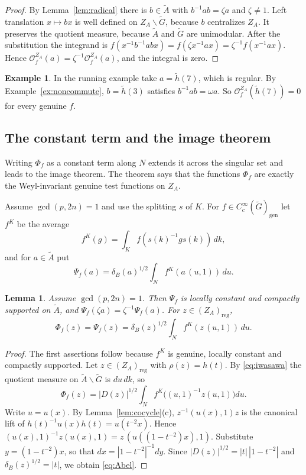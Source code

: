 \documentclass[12pt,letterpaper]{article}
\numberwithin{equation}{section}
\theoremstyle{plain}
\newtheorem{lemma}[theorem]{Lemma}
\theoremstyle{definition}
\newtheorem{example}[theorem]{Example}
\theoremstyle{remark}
\newcommand{\Gt}{\widetilde G}
\newcommand{\At}{\widetilde A}
\newcommand{\hl}{\tilde h}
\newcommand{\ZA}{Z_A}
\newcommand{\gen}{\mathrm{gen}}
\newcommand{\reg}{\mathrm{reg}}
\begin{document}
\begin{proof}
By Lemma~\ref{lem:radical} there is $b\in\At$ with $b^{-1}ab=\zeta a$
and $\zeta\ne1$. Left translation $x\mapsto bx$ is well defined on
$\ZA\backslash\Gt$, because $b$ centralizes $\ZA$. It preserves the
quotient measure, because $\At$ and $\Gt$ are unimodular. After the
substitution the integrand is
$f(x^{-1}b^{-1}abx)=f(\zeta x^{-1}ax)=\zeta^{-1}f(x^{-1}ax)$. Hence
$\mathcal O_f^{\ZA}(a)=\zeta^{-1}\mathcal O_f^{\ZA}(a)$, and the
integral is zero.
\end{proof}

\begin{example}\label{ex:vanishing}
In the running example take $a=\hl(7)$, which is regular. By
Example~\ref{ex:noncommute}, $b=\hl(3)$ satisfies $b^{-1}ab=\omega a$.
So
$\mathcal O_f^{\ZA}(\hl(7))=0$ for every genuine $f$.
\end{example}

\subsection*{The constant term and the image theorem}

Writing $\Phi_f$ as a constant term along $N$ extends it across the
singular set and leads to the image theorem. The theorem says that the
functions $\Phi_f$ are exactly the Weyl-invariant genuine test
functions on $\ZA$.

Assume $\gcd(p,2n)=1$ and use the splitting $s$ of $K$. For
$f\in C_c^\infty(\Gt)_\gen$ let $f^K$ be the average
\[
f^K(g)=\int_Kf(s(k)^{-1}gs(k))\,dk,
\]
and for $a\in\At$ put
\begin{equation}\label{eq:Psi}
\Psi_f(a)=\delta_B(a)^{1/2}\int_Nf^K(a\,(u,1))\,du .
\end{equation}

\begin{lemma}\label{lem:abel}
Assume $\gcd(p,2n)=1$. Then $\Psi_f$ is locally constant and compactly
supported on $\At$, and $\Psi_f(\zeta a)=\zeta^{-1}\Psi_f(a)$. For
$z\in(\ZA)_\reg$,
\begin{equation}\label{eq:Abel}
\Phi_f(z)=\Psi_f(z)=\delta_B(z)^{1/2}\int_Nf^K(z\,(u,1))\,du .
\end{equation}
\end{lemma}

\begin{proof}
The first assertions follow because $f^K$ is genuine, locally constant
and compactly supported. Let $z\in(\ZA)_\reg$ with $\rho(z)=h(t)$. By
\eqref{eq:iwasawa} the quotient measure on $\At\backslash\Gt$ is
$du\,dk$, so
\[
\Phi_f(z)=|D(z)|^{1/2}\int_Nf^K\bigl((u,1)^{-1}z(u,1)\bigr)du .
\]
Write $u=u(x)$. By Lemma~\ref{lem:cocycle}(c), $z^{-1}(u(x),1)z$ is
the canonical lift of $h(t)^{-1}u(x)h(t)=u(t^{-2}x)$. Hence
$(u(x),1)^{-1}z(u(x),1)=z\,(u((1-t^{-2})x),1)$. Substitute
$y=(1-t^{-2})x$, so that $dx=|1-t^{-2}|^{-1}dy$. Since
$|D(z)|^{1/2}=|t|\,|1-t^{-2}|$ and $\delta_B(z)^{1/2}=|t|$, we obtain
\eqref{eq:Abel}.
\end{proof}
\end{document}
